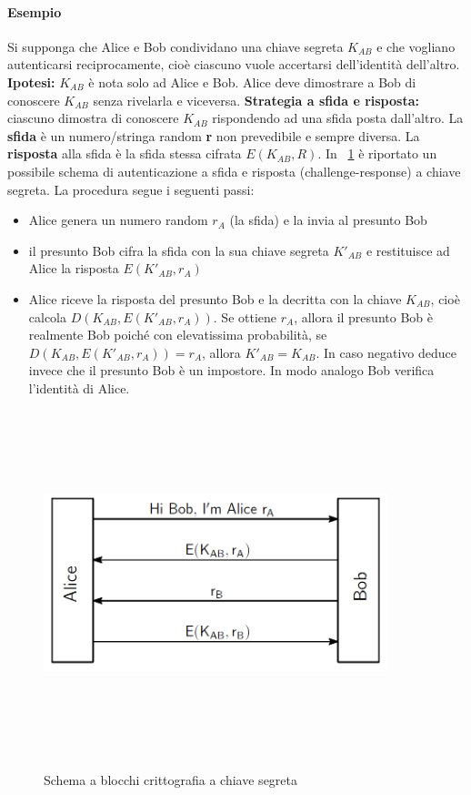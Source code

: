 \paragraph{Esempio}
Si supponga che Alice e Bob condividano una chiave segreta $K_{AB}$ e che vogliano autenticarsi reciprocamente, cioè ciascuno vuole accertarsi dell'identità dell'altro. \newline \textbf{Ipotesi:} $K_{AB}$ è nota solo ad Alice e Bob. Alice deve dimostrare a Bob di conoscere $K_{AB}$ senza rivelarla e viceversa. \newline \textbf{Strategia a sfida e risposta:} ciascuno dimostra di conoscere $K_{AB}$ rispondendo ad una sfida posta dall'altro. La \textbf{sfida} è un numero/stringa random \textbf{r} non prevedibile e sempre diversa. La \textbf{risposta} alla sfida è la sfida stessa cifrata \textbf{$E(K_{AB},R)$}. In \figurename ~\ref{fig:strong_auth_sec} è riportato un possibile schema di autenticazione a sfida e risposta (challenge-response) a chiave segreta. La procedura segue i seguenti passi:
\begin{itemize}
  \item Alice genera un numero random $r_{A}$ (la sfida) e la invia al presunto Bob
  \item il presunto Bob cifra la sfida con la sua chiave segreta $K'_{AB}$ e restituisce ad Alice la risposta $E(K'_{AB}, r_{A})$
  \item Alice riceve la risposta del presunto Bob e la decritta con la chiave $K_{AB}$, cioè calcola $D(K_{AB},E(K'_{AB}, r_{A}))$. Se ottiene $r_{A}$, allora il presunto Bob è realmente Bob poiché con elevatissima probabilità, se $D(K_{AB},E(K'_{AB}, r_{A})) = r_{A}$, allora $K'_{AB} = K_{AB}$. In caso negativo deduce invece che il presunto Bob è un impostore. In modo analogo Bob verifica l'identità di Alice.
\end{itemize}
\begin{figure}[htbp]
	\centering%
	\subfigure%
	{\includegraphics[height=10cm, width=10cm, keepaspectratio]{Immagini/chiave_segreta/strong_auth_secret.png}}
	\caption{Schema a blocchi crittografia a chiave segreta \label{fig:strong_auth_sec}} 	
\end{figure}

